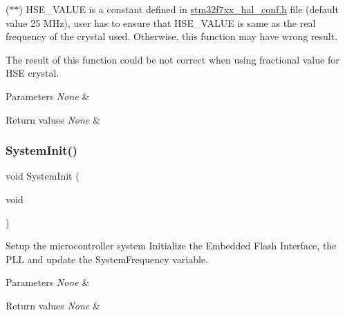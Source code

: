 ($\ast$$\ast$) H\+S\+E\+\_\+\+V\+A\+L\+UE is a constant defined in \hyperlink{stm32f7xx__hal__conf_8h}{stm32f7xx\+\_\+hal\+\_\+conf.\+h} file (default value 25 M\+Hz), user has to ensure that H\+S\+E\+\_\+\+V\+A\+L\+UE is same as the real frequency of the crystal used. Otherwise, this function may have wrong result.


\begin{DoxyItemize}
\item The result of this function could be not correct when using fractional value for H\+SE crystal.
\end{DoxyItemize}


\begin{DoxyParams}{Parameters}
{\em None} & \\
\hline
\end{DoxyParams}

\begin{DoxyRetVals}{Return values}
{\em None} & \\
\hline
\end{DoxyRetVals}
\mbox{\label{group___s_t_m32_f7xx___system___private___functions_ga93f514700ccf00d08dbdcff7f1224eb2}} 
\subsubsection{\texorpdfstring{System\+Init()}{SystemInit()}}
{\footnotesize\ttfamily void System\+Init (\begin{DoxyParamCaption}\item[{void}]{ }\end{DoxyParamCaption})}



Setup the microcontroller system Initialize the Embedded Flash Interface, the P\+LL and update the System\+Frequency variable. 


\begin{DoxyParams}{Parameters}
{\em None} & \\
\hline
\end{DoxyParams}

\begin{DoxyRetVals}{Return values}
{\em None} & \\
\hline
\end{DoxyRetVals}
